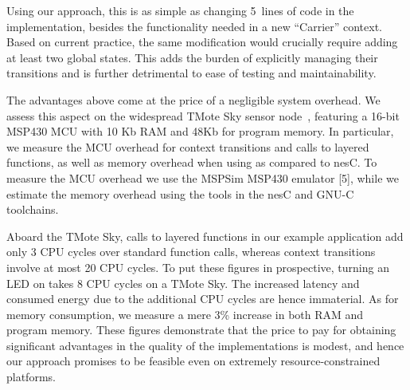 Using our approach, this is as simple as changing 5~lines of code in
the \conesc implementation, besides the functionality needed in a
new ``Carrier'' context.  Based on current practice, the same
modification would crucially require adding at least two global
states.  This adds the burden of explicitly managing their transitions
and is further detrimental to ease of testing and maintainability.

 The advantages above come at the price
of a negligible system overhead. We assess this aspect on the
widespread TMote Sky sensor node~\cite{polastre05telos}, featuring a
16-bit MSP430 MCU with 10 Kb RAM and 48Kb for program memory. In
particular, we measure the MCU overhead for context transitions and
calls to layered functions, as well as memory overhead when using
\conesc as compared to nesC. To measure the MCU overhead we use the
MSPSim MSP430 emulator [5], while we estimate the memory overhead
using the tools in the nesC and GNU-C toolchains.

Aboard the TMote Sky, calls to layered functions in our example
application add only 3 CPU cycles over standard function calls,
whereas context transitions involve at most 20 CPU cycles. To put
these figures in prospective, turning an LED on takes 8 CPU cycles on
a TMote Sky. The increased latency and consumed energy due to the
additional CPU cycles are hence immaterial. As for memory consumption,
we measure a mere 3\% increase in both RAM and program memory. These
figures demonstrate that the price to pay for obtaining significant
advantages in the quality of the implementations is modest, and hence
our approach promises to be feasible even on extremely
resource-constrained platforms.





